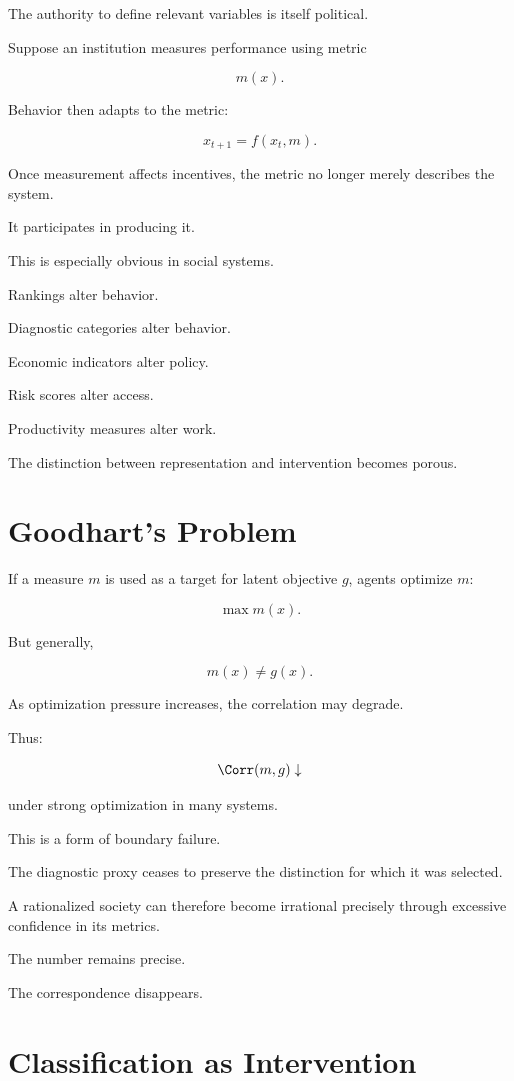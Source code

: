 \documentclass[11pt,oneside]{book}
\theoremstyle{definition}
\theoremstyle{remark}
\begin{document}
The authority to define relevant variables is itself political.

Suppose an institution measures performance using metric

\[
m(x).
\]

Behavior then adapts to the metric:

\[
x_{t+1}
=
f(x_t,m).
\]

Once measurement affects incentives, the metric no longer merely describes the system.

It participates in producing it.

This is especially obvious in social systems.

Rankings alter behavior.

Diagnostic categories alter behavior.

Economic indicators alter policy.

Risk scores alter access.

Productivity measures alter work.

The distinction between representation and intervention becomes porous.

\section{Goodhart's Problem}

If a measure \(m\) is used as a target for latent objective \(g\), agents optimize \(m\):

\[
\max m(x).
\]

But generally,

\[
m(x)\neq g(x).
\]

As optimization pressure increases, the correlation may degrade.

Thus:

\[
\Corr(m,g)\downarrow
\]

under strong optimization in many systems.

This is a form of boundary failure.

The diagnostic proxy ceases to preserve the distinction for which it was selected.

A rationalized society can therefore become irrational precisely through excessive confidence in its metrics.

The number remains precise.

The correspondence disappears.

\section{Classification as Intervention}
\end{document}
